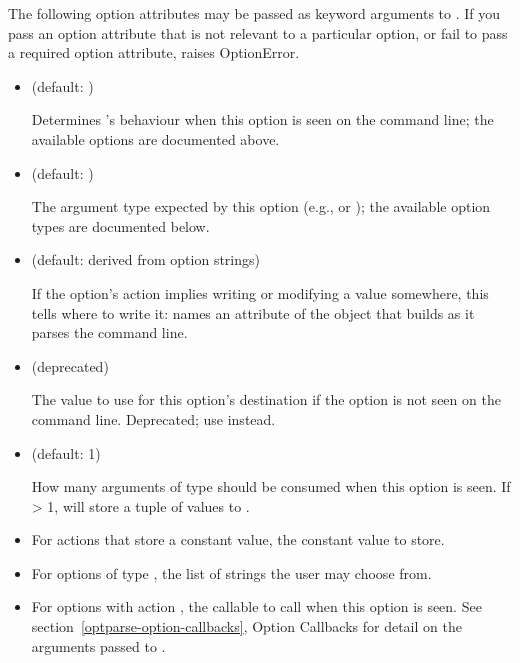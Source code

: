The following option attributes may be passed as keyword arguments
to .  If you pass an option attribute
that is not relevant to a particular option, or fail to pass a required
option attribute,  raises OptionError.
\begin{itemize}
\item {} 
 (default: )

Determines 's behaviour when this option is seen on the command
line; the available options are documented above.

\item {} 
 (default: )

The argument type expected by this option (e.g.,  or
); the available option types are documented below.

\item {} 
 (default: derived from option strings)

If the option's action implies writing or modifying a value somewhere,
this tells  where to write it:  names an attribute of the
 object that  builds as it parses the command line.

\item {} 
 (deprecated)

The value to use for this option's destination if the option is not
seen on the command line.  Deprecated; use 
instead.

\item {} 
 (default: 1)

How many arguments of type  should be consumed when this
option is seen.  If {\textgreater} 1,  will store a tuple of values to
.

\item {} 

For actions that store a constant value, the constant value to store.

\item {} 

For options of type , the list of strings the user
may choose from.

\item {} 

For options with action , the callable to call when this
option is seen.  See section~\ref{optparse-option-callbacks}, Option Callbacks for detail on the arguments
passed to .


\end{itemize}
